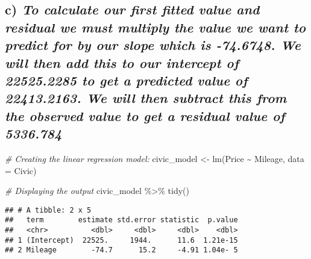 \documentclass[
]{article}
\newenvironment{Shaded}{\begin{snugshade}}{\end{snugshade}}
\newcommand{\AttributeTok}[1]{\textcolor[rgb]{0.77,0.63,0.00}{#1}}
\newcommand{\CommentTok}[1]{\textcolor[rgb]{0.56,0.35,0.01}{\textit{#1}}}
\newcommand{\FunctionTok}[1]{\textcolor[rgb]{0.00,0.00,0.00}{#1}}
\newcommand{\NormalTok}[1]{#1}
\newcommand{\OtherTok}[1]{\textcolor[rgb]{0.56,0.35,0.01}{#1}}
\newcommand{\SpecialCharTok}[1]{\textcolor[rgb]{0.00,0.00,0.00}{#1}}
\begin{document}
\hypertarget{c-to-calculate-our-first-fitted-value-and-residual-we-must-multiply-the-value-we-want-to-predict-for-by-our-slope-which-is--74.6748.-we-will-then-add-this-to-our-intercept-of-22525.2285-to-get-a-predicted-value-of-22413.2163.-we-will-then-subtract-this-from-the-observed-value-to-get-a-residual-value-of-5336.784}{%
\subsection{\texorpdfstring{c) \emph{To calculate our first fitted value
and residual we must multiply the value we want to predict for by our
slope which is -74.6748. We will then add this to our intercept of
22525.2285 to get a predicted value of 22413.2163. We will then subtract
this from the observed value to get a residual value of
5336.784}}{c) To calculate our first fitted value and residual we must multiply the value we want to predict for by our slope which is -74.6748. We will then add this to our intercept of 22525.2285 to get a predicted value of 22413.2163. We will then subtract this from the observed value to get a residual value of 5336.784}}\label{c-to-calculate-our-first-fitted-value-and-residual-we-must-multiply-the-value-we-want-to-predict-for-by-our-slope-which-is--74.6748.-we-will-then-add-this-to-our-intercept-of-22525.2285-to-get-a-predicted-value-of-22413.2163.-we-will-then-subtract-this-from-the-observed-value-to-get-a-residual-value-of-5336.784}}

\begin{Shaded}
\begin{Highlighting}[]
\CommentTok{\# Creating the linear regression model:}
\NormalTok{civic\_model }\OtherTok{\textless{}{-}} \FunctionTok{lm}\NormalTok{(Price }\SpecialCharTok{\textasciitilde{}}\NormalTok{ Mileage, }\AttributeTok{data =}\NormalTok{ Civic)}

\CommentTok{\# Displaying the output}
\NormalTok{civic\_model }\SpecialCharTok{\%\textgreater{}\%}
  \FunctionTok{tidy}\NormalTok{()}
\end{Highlighting}
\end{Shaded}

\begin{verbatim}
## # A tibble: 2 x 5
##   term        estimate std.error statistic  p.value
##   <chr>          <dbl>     <dbl>     <dbl>    <dbl>
## 1 (Intercept)  22525.     1944.      11.6  1.21e-15
## 2 Mileage        -74.7      15.2     -4.91 1.04e- 5
\end{verbatim}
\end{document}
